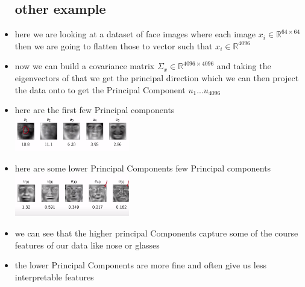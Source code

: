 \documentclass{article}
\begin{document}
\begin{itemize}
\subsection*{other example}
\item here we are looking at a dataset of face images where each image $x_i\in \mathbb{R}^{64\times 64}$ then we are going to flatten those to vector such that $x_i\in \mathbb{R}^{4096}$
\item now we can build a covariance matrix $\Sigma_{x}\in \mathbb{R}^{4096\times 4096}$ and taking the eigenvectors of that we get the principal direction which we can then project the data onto to get the Principal Component $u_1...u_{4096}$
\item here are the first few Principal components \\ \includegraphics*[width=5cm]{notes/week_8/vedio_2/immages/v2_9.png}
\item here are some lower Principal Components few Principal components \\ \includegraphics*[width=5cm]{notes/week_8/vedio_2/immages/v2_10.png}
\item we can see that the higher principal Components capture some of the course features of our data like nose or glasses 
\item the lower Principal Components are more fine and often give us less interpretable features 
\end{itemize}
\end{document}
